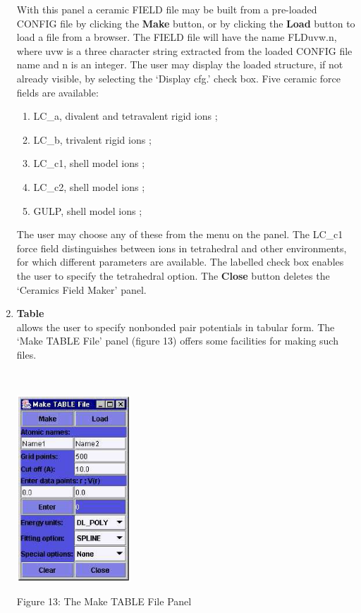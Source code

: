 \begin{enumerate}
\noindent
With this panel a ceramic FIELD file may be built from a pre-loaded
CONFIG file by clicking the {\bf Make} button, or by clicking the {\bf
Load} button to load a file from a browser. The FIELD file will have
the name FLDuvw.n, where uvw is a three character string extracted
from the loaded CONFIG file name and n is an integer. The user may
display the loaded structure, if not already visible, by selecting the
`Display cfg.'  check box. Five ceramic force fields are available:
\begin{enumerate}
\item LC\_a, divalent and tetravalent rigid ions \cite{lewis-85a};
\item LC\_b, trivalent rigid ions \cite{lewis-85a};
\item LC\_c1, shell model ions \cite{lewis-85a};
\item LC\_c2, shell model ions \cite{lewis-85a};
\item GULP, shell model ions \cite{bush-94a};
\end{enumerate}
The user may choose any of these from the menu on the panel. The
LC\_c1 force field distinguishes between ions in tetrahedral and other
environments, for which different parameters are available. The
labelled check box enables the user to specify the tetrahedral option.
The {\bf Close} button deletes the `Ceramics Field Maker' panel.
\item{\bf Table}\\
\DD{} allows the user to specify nonbonded pair potentials  in tabular
form. The `Make TABLE File' panel (figure 13) offers some facilities
for making such files.

~

\vskip 5mm
\centerline{\includegraphics[height=7cm]{table.ps}}
\centerline{Figure 13: The Make TABLE File Panel}
\vskip 5mm

~


\end{enumerate}
